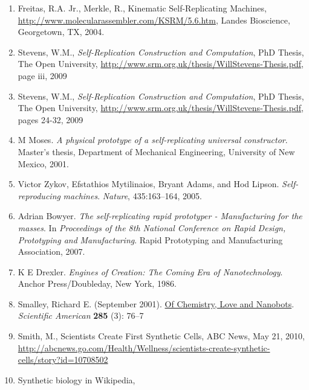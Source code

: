 \documentclass[letterpaper]{article}
\newcommand\textstylecitation[1]{#1}
\begin{document}
\begin{enumerate}
\item \label{bkm:Ref330755466}Freitas, R.A. Jr., Merkle, R., Kinematic
Self-Replicating Machines,
\url{http://www.molecularassembler.com/KSRM/5.6.htm}, Landes
Bioscience, Georgetown, TX, 2004.
\item \label{bkm:Ref330757844}Stevens, W.M., \textit{Self-Replication
Construction and Computation}, PhD Thesis, The Open University,
\url{http://www.srm.org.uk/thesis/WillStevens-Thesis.pdf}, page iii,
2009
\item \label{bkm:Ref330750347}Stevens, W.M., \textit{Self-Replication
Construction and Computation}, PhD Thesis, The Open University,
\url{http://www.srm.org.uk/thesis/WillStevens-Thesis.pdf}, pages 24-32,
2009
\item \label{bkm:Ref330751664}M Moses. \textit{A physical prototype of a
self-replicating universal constructor}.  Master’s thesis, Department
of Mechanical Engineering, University of New Mexico, 2001.
\item \label{bkm:Ref330752277}Victor Zykov, Efstathios Mytilinaios,
Bryant Adams, and Hod Lipson. \textit{Self-reproducing}\textit{
machines}. \textit{Nature}, 435:163–164, 2005.
\item \label{bkm:Ref330753103}Adrian Bowyer.  \textit{The
self-replicating rapid prototyper - Manufacturing for the masses}. In
\textit{Proceedings of the 8th National Conference on Rapid Design,
Prototyping and} \textit{Manufacturing}. Rapid Prototyping and
Manufacturing Association, 2007.
\item \label{bkm:Ref330756364}K E Drexler. \textit{Engines of Creation:
The Coming Era of Nanotechnology}. Anchor Press/Doubleday, New York,
1986.
\item \label{bkm:Ref331270777}\textstylecitation{Smalley, Richard E.
(September 2001).
}\href{http://www.sciamdigital.com/index.cfm?fa=Products.ViewIssuePreview&ARTICLEID_CHAR=F90C4210-C153-4B2F-83A1-28F2012B637}{{\textquotedbl}Of
Chemistry, Love and Nanobots{\textquotedbl}}\textstylecitation{.
}\textstylecitation{\textit{Scientific American}}\textstylecitation{
}\textstylecitation{\textbf{285}}\textstylecitation{ (3): 76–7}
\item \label{bkm:Ref330845705}Smith, M.,
\textcolor[rgb]{0.2,0.2,0.2}{Scientists Create First
{\textquotesingle}Synthetic{\textquotesingle} Cells, ABC News, May 21,
2010,
}\url{http://abcnews.go.com/Health/Wellness/scientists-create-synthetic-cells/story?id=10708502}
\item \label{bkm:Ref330927503}Synthetic biology in Wikipedia,

\end{enumerate}
\end{document}
